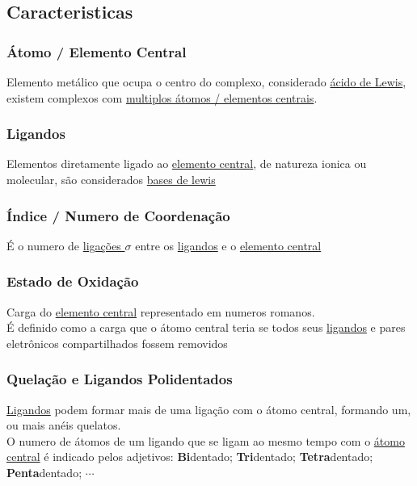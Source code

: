 \documentclass[12pt]{report}
\begin{document}
\subsection{Caracteristicas}

\hypertarget{elemento central}{}%
\subsubsection{Átomo / Elemento Central}

Elemento metálico que ocupa o centro do complexo, considerado \hyperlink{Lewis}{ácido de Lewis}, existem complexos com \hyperlink{complexo polinuclear}{multiplos átomos / elementos centrais}.

\hypertarget{ligando}{}%
\subsubsection{Ligandos}

Elementos diretamente ligado ao \hyperlink{elemento central}{elemento central}, de natureza ionica ou molecular, são considerados \hyperlink{lewis}{bases de lewis}

\hypertarget{indice de coordenacao}{}%
\subsubsection{Índice / Numero de Coordenação}

É o numero de \hyperlink{ligacao sigma}{ligações $\sigma$} entre os \hyperlink{ligando}{ligandos} e o \hyperlink{elemento central}{elemento central}

\hypertarget{estado de oxidacao}{}%
\subsubsection{Estado de Oxidação}

Carga do \hyperlink{elemento central}{elemento central} representado em numeros romanos.\\
É definido como a carga que o átomo central teria se todos seus \hyperlink{ligando}{ligandos} e pares eletrônicos compartilhados fossem removidos

\hypertarget{quelacao}{}%
\subsubsection{Quelação e Ligandos Polidentados}

\hyperlink{ligando}{Ligandos} podem formar mais de uma ligação com o átomo central, formando um, ou mais anéis quelatos.\\
O numero de átomos de um ligando que se ligam ao mesmo tempo com o \hyperlink{elemento central}{átomo central} é indicado pelos adjetivos:
\textbf{Bi}dentado;
\textbf{Tri}dentado;
\textbf{Tetra}dentado;
\textbf{Penta}dentado;
$\cdots$
\end{document}

